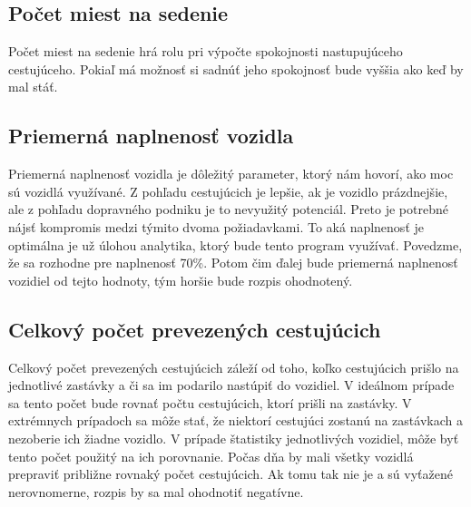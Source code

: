 \subsection*{Počet miest na sedenie}
Počet miest na sedenie hrá rolu pri výpočte spokojnosti nastupujúceho cestujúceho.
Pokiaľ má možnosť si sadnúť jeho spokojnosť bude vyššia ako keď by mal stáť.

\subsection*{Priemerná naplnenosť vozidla}
Priemerná naplnenosť vozidla je dôležitý parameter, ktorý nám hovorí, ako moc sú vozidlá využívané.
Z pohľadu cestujúcich je lepšie, ak je vozidlo prázdnejšie, ale z pohľadu dopravného podniku je to nevyužitý potenciál.
Preto je potrebné nájsť kompromis medzi týmito dvoma požiadavkami.
To aká naplnenosť je optimálna je už úlohou analytika, ktorý bude tento program využívať.
Povedzme, že sa rozhodne pre naplnenosť 70\%.
Potom čim ďalej bude priemerná naplnenosť vozidiel od tejto hodnoty, tým horšie bude rozpis ohodnotený.

\subsection*{Celkový počet prevezených cestujúcich}
Celkový počet prevezených cestujúcich záleží od toho, koľko cestujúcich prišlo na jednotlivé zastávky a či sa im podarilo nastúpiť do vozidiel.
V ideálnom prípade sa tento počet bude rovnať počtu cestujúcich, ktorí prišli na zastávky.
V extrémnych prípadoch sa môže stať, že niektorí cestujúci zostanú na zastávkach a nezoberie ich žiadne vozidlo.
V prípade štatistiky jednotlivých vozidiel, môže byť tento počet použitý na ich porovnanie.
Počas dňa by mali všetky vozidlá prepraviť približne rovnaký počet cestujúcich.
Ak tomu tak nie je a sú vyťažené nerovnomerne, rozpis by sa mal ohodnotiť negatívne.

